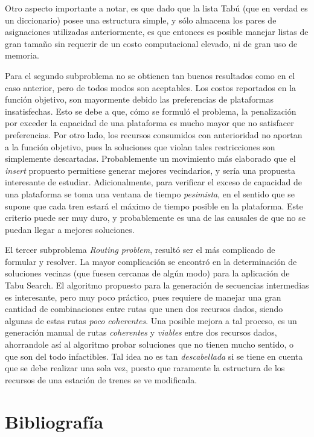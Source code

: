 \documentclass[letter, 10pt]{article}
\begin{document}
Otro aspecto importante a notar, es que dado que la lista Tabú (que en verdad es un diccionario) posee una estructura simple, y sólo almacena los pares de asignaciones utilizadas anteriormente, es que entonces es posible manejar listas de gran tamaño sin requerir de un costo computacional elevado, ni de gran uso de memoria.

Para el segundo subproblema no se obtienen tan buenos resultados como en el caso anterior, pero de todos modos son aceptables. Los costos reportados en la función objetivo, son mayormente debido las preferencias de plataformas insatisfechas. Esto se debe  a que, cómo se formuló el problema, la penalización por exceder la capacidad de una plataforma es mucho mayor que no satisfacer preferencias. Por otro lado, los recursos consumidos con anterioridad no aportan a la función objetivo, pues la soluciones que violan tales restricciones son simplemente descartadas. Probablemente un movimiento más elaborado que el \textit{insert} propuesto permitiese generar mejores vecindarios, y sería una propuesta interesante de estudiar. Adicionalmente, para verificar el exceso de capacidad de una plataforma se toma una ventana de tiempo \textit{pesimista}, en el sentido que se supone que cada tren estará el máximo de tiempo posible en la plataforma. Este criterio puede ser muy duro, y probablemente es una de las causales de que no se puedan llegar a mejores soluciones.

El tercer subproblema \textit{Routing problem}, resultó ser el más complicado de formular y resolver. La mayor complicación se encontró en la determinación de soluciones vecinas (que fuesen cercanas de algún modo) para la aplicación de Tabu Search. El algoritmo propuesto para la generación de secuencias intermedias es interesante, pero muy poco práctico, pues requiere de manejar una gran cantidad de combinaciones entre rutas que unen dos recursos dados, siendo algunas de estas rutas \textit{poco coherentes}. Una posible mejora a tal proceso, es un generación manual de rutas \textit{coherentes} y \textit{viables} entre dos recursos dados, ahorrandole así al algoritmo probar soluciones que no tienen mucho sentido, o que son del todo infactibles. Tal idea no es tan \textit{descabellada} si se tiene en cuenta que se debe realizar una sola vez, puesto que raramente la estructura de los recursos de una estación de trenes se ve modificada.





\newpage
\section{Bibliografía}



\end{document}
